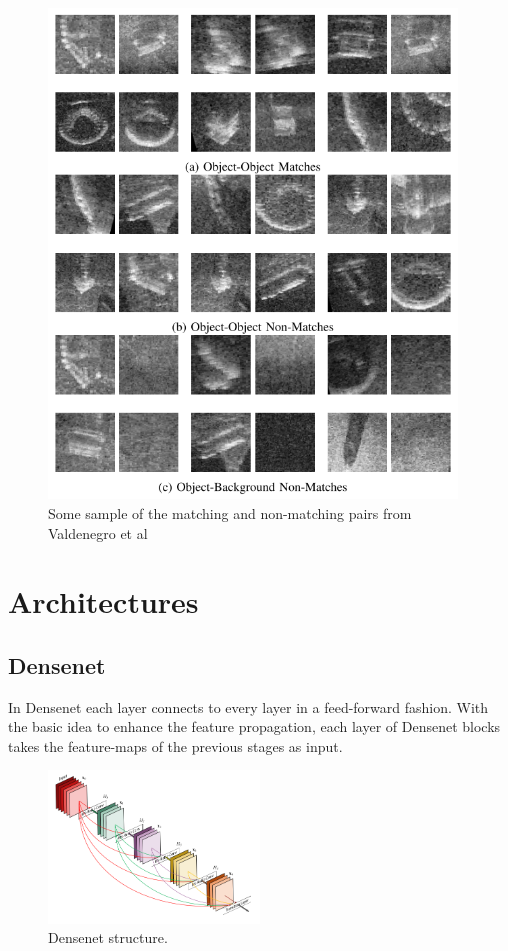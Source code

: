 \begin{figure}[ht]
\centering
\includegraphics[height= 13cm]{images/densenet/generated_patches}
\caption{Some sample of the matching and non-matching pairs from Valdenegro et al \cite{stateoftheart}}
\label{fig:generated_patches}
\end{figure}

\flushbottom
\newpage
\section{Architectures}

\subsection{Densenet}
In Densenet each layer connects to every layer in a feed-forward fashion. 
With the basic idea to enhance the feature propagation, each layer of Densenet blocks takes the feature-maps of the previous stages as input.  
\begin{figure}[ht]
\centering
\includegraphics[width=0.5\textwidth]{images/densenet/densenet.png}
\caption{Densenet structure.}
\label{fig:densenet}
\end{figure}

